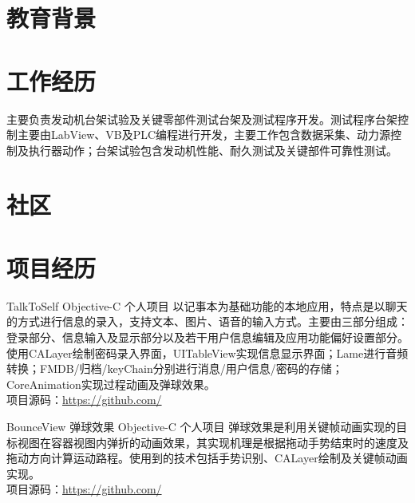 \documentclass[11pt,a4paper]{moderncv}
\begin{document}
\maketitle

\section{教育背景}

\section{工作经历}
{主要负责发动机台架试验及关键零部件测试台架及测试程序开发。测试程序台架控制主要由LabView、VB及PLC编程进行开发，主要工作包含数据采集、动力源控制及执行器动作；台架试验包含发动机性能、耐久测试及关键部件可靠性测试。}  %


\section{社区}

\section{项目经历}
\renewcommand{\baselinestretch}{1.2}

{TalkToSelf}
{Objective-C}
{个人项目}{}
{以记事本为基础功能的本地应用，特点是以聊天的方式进行信息的录入，支持文本、图片、语音的输入方式。主要由三部分组成：登录部分、信息输入及显示部分以及若干用户信息编辑及应用功能偏好设置部分。使用CALayer绘制密码录入界面，UITableView实现信息显示界面；Lame进行音频转换；FMDB/归档/keyChain分别进行消息/用户信息/密码的存储；CoreAnimation实现过程动画及弹球效果。\\项目源码：\url{https://github.com/}}

{BounceView 弹球效果}
{Objective-C}
{个人项目}{}
{弹球效果是利用关键帧动画实现的目标视图在容器视图内弹折的动画效果，其实现机理是根据拖动手势结束时的速度及拖动方向计算运动路程。使用到的技术包括手势识别、CALayer绘制及关键帧动画实现。\\项目源码：\url{https://github.com/}}
\end{document}
